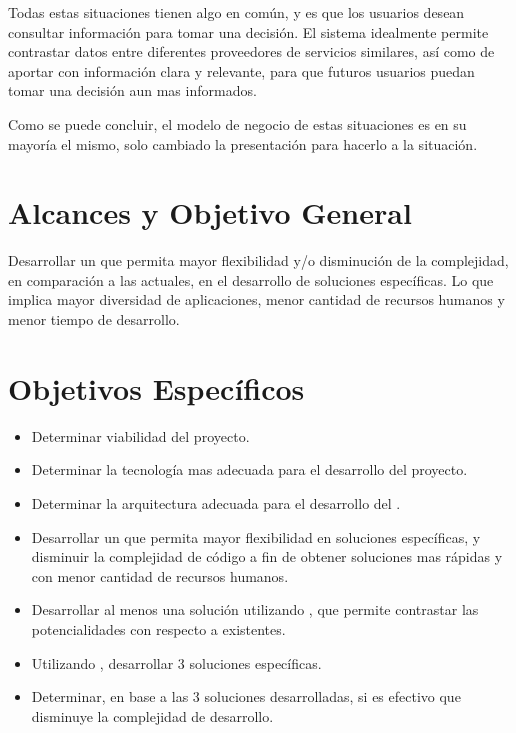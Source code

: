 Todas estas situaciones tienen algo en común, y es que los usuarios desean consultar información para tomar una decisión. El sistema idealmente permite contrastar datos entre diferentes proveedores de servicios similares, así como de aportar con información clara y relevante, para que futuros usuarios puedan tomar una decisión aun mas informados.

Como se puede concluir, el modelo de negocio de estas situaciones es en su mayoría el mismo, solo cambiado la presentación para hacerlo \adhoc a la situación.

\section{Alcances y Objetivo General}\label{cap:intro:alcances}

Desarrollar un \framework \ecommerce que permita mayor flexibilidad y/o disminución de la complejidad, en comparación a las \frameworks actuales, en el desarrollo de soluciones específicas. Lo que implica mayor diversidad de aplicaciones, menor cantidad de recursos humanos y menor tiempo de desarrollo.

\section{Objetivos Específicos}\label{cap:intro:objetivos}
\begin{itemize}
	\item Determinar viabilidad del proyecto.
	\item Determinar la tecnología mas adecuada para el desarrollo del proyecto.
	\item Determinar la arquitectura adecuada para el desarrollo del \framework.
	\item Desarrollar un \ecommerce \framework que permita mayor flexibilidad en soluciones específicas, y disminuir la complejidad de código a fin de obtener soluciones mas rápidas y con menor cantidad de recursos humanos.
	\item Desarrollar al menos una solución utilizando \frameworkname, que permite contrastar las potencialidades con respecto a \frameworks existentes.
	\item Utilizando \frameworkname, desarrollar 3 soluciones específicas.
	\item Determinar, en base a las 3 soluciones desarrolladas, si es efectivo que \frameworkname disminuye la complejidad de desarrollo. 
\end{itemize}

